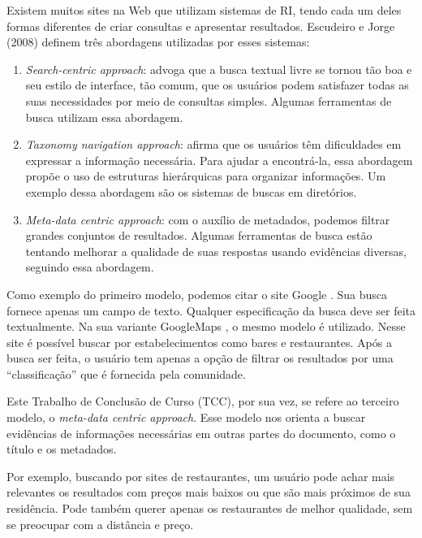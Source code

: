 Existem muitos sites na Web que utilizam sistemas de RI, tendo cada um deles formas diferentes de criar consultas e apresentar resultados. Escudeiro e Jorge (2008) definem três abordagens utilizadas por esses sistemas:

\begin{enumerate}
\item \emph{Search-centric approach}: advoga que a busca textual livre se tornou tão boa e seu estilo de interface, tão comum, que os usuários podem satisfazer todas as suas necessidades por meio de consultas simples. Algumas ferramentas de busca utilizam essa abordagem.

\item \emph{Taxonomy navigation approach}: afirma que os usuários têm dificuldades em expressar a informação necessária. Para ajudar a encontrá-la, essa abordagem propõe o uso de estruturas hierárquicas para organizar informações. Um exemplo dessa abordagem são os sistemas de buscas em diretórios.

\item \emph{Meta-data centric approach}: com o auxílio de metadados, podemos filtrar grandes conjuntos de resultados. Algumas ferramentas de busca estão tentando melhorar a qualidade de suas respostas usando evidências diversas, seguindo essa abordagem.

\end{enumerate}

Como exemplo do primeiro modelo, podemos citar o site Google \cite{Google}. Sua busca fornece apenas um campo de texto. Qualquer especificação da busca deve ser feita textualmente. Na sua variante GoogleMaps \cite{GoogleMaps}, o mesmo modelo é utilizado. Nesse site é possível buscar por estabelecimentos como bares e restaurantes. Após a busca ser feita, o usuário tem apenas a opção de filtrar os resultados por uma ``classificação'' que é fornecida pela comunidade.

Este Trabalho de Conclusão de Curso (TCC), por sua vez, se refere ao terceiro modelo, o \emph{meta-data centric approach}. Esse modelo nos orienta a buscar evidências de informações necessárias em outras partes do documento, como o título e os metadados. 

Por exemplo, buscando por sites de restaurantes, um usuário pode achar mais relevantes os resultados com preços mais baixos ou que são mais próximos de sua residência. Pode também querer apenas os restaurantes de melhor qualidade, sem se preocupar com a distância e preço.

